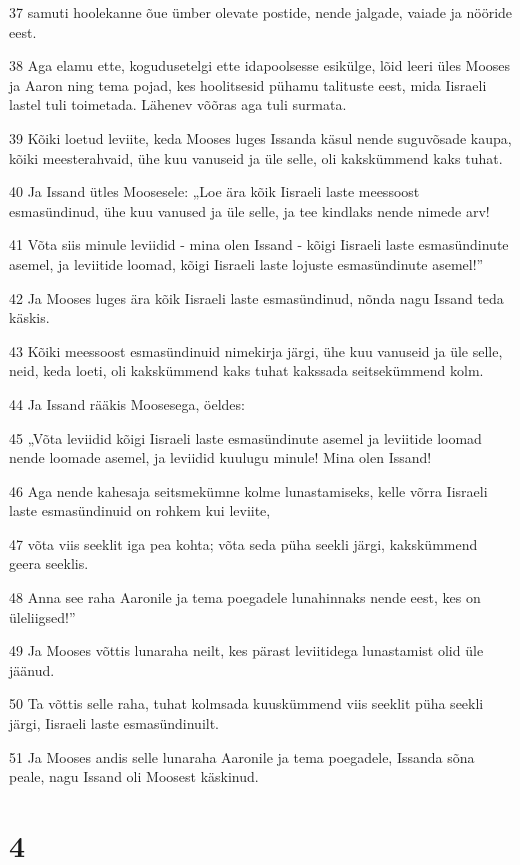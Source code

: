\par 37 samuti hoolekanne õue ümber olevate postide, nende jalgade, vaiade ja nööride eest.
\par 38 Aga elamu ette, kogudusetelgi ette idapoolsesse esikülge, lõid leeri üles Mooses ja Aaron ning tema pojad, kes hoolitsesid pühamu talituste eest, mida Iisraeli lastel tuli toimetada. Lähenev võõras aga tuli surmata.
\par 39 Kõiki loetud leviite, keda Mooses luges Issanda käsul nende suguvõsade kaupa, kõiki meesterahvaid, ühe kuu vanuseid ja üle selle, oli kakskümmend kaks tuhat.
\par 40 Ja Issand ütles Moosesele: „Loe ära kõik Iisraeli laste meessoost esmasündinud, ühe kuu vanused ja üle selle, ja tee kindlaks nende nimede arv!
\par 41 Võta siis minule leviidid - mina olen Issand - kõigi Iisraeli laste esmasündinute asemel, ja leviitide loomad, kõigi Iisraeli laste lojuste esmasündinute asemel!”
\par 42 Ja Mooses luges ära kõik Iisraeli laste esmasündinud, nõnda nagu Issand teda käskis.
\par 43 Kõiki meessoost esmasündinuid nimekirja järgi, ühe kuu vanuseid ja üle selle, neid, keda loeti, oli kakskümmend kaks tuhat kakssada seitsekümmend kolm.
\par 44 Ja Issand rääkis Moosesega, öeldes:
\par 45 „Võta leviidid kõigi Iisraeli laste esmasündinute asemel ja leviitide loomad nende loomade asemel, ja leviidid kuulugu minule! Mina olen Issand!
\par 46 Aga nende kahesaja seitsmekümne kolme lunastamiseks, kelle võrra Iisraeli laste esmasündinuid on rohkem kui leviite,
\par 47 võta viis seeklit iga pea kohta; võta seda püha seekli järgi, kakskümmend geera seeklis.
\par 48 Anna see raha Aaronile ja tema poegadele lunahinnaks nende eest, kes on üleliigsed!”
\par 49 Ja Mooses võttis lunaraha neilt, kes pärast leviitidega lunastamist olid üle jäänud.
\par 50 Ta võttis selle raha, tuhat kolmsada kuuskümmend viis seeklit püha seekli järgi, Iisraeli laste esmasündinuilt.
\par 51 Ja Mooses andis selle lunaraha Aaronile ja tema poegadele, Issanda sõna peale, nagu Issand oli Moosest käskinud.

\chapter{4}


